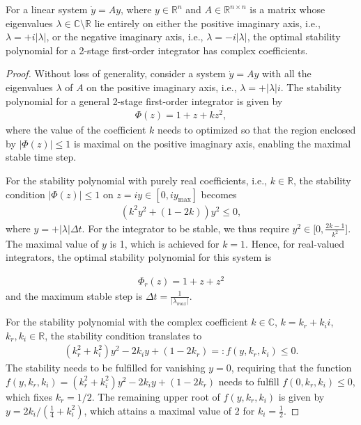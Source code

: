 \documentclass[10pt,a4paper]{amsart}
\begin{document}
\begin{theorem}\label{theorem1}
For a linear system $\dot{y} = A y$, where $y \in \mathbb{R}^n$ and $A \in \mathbb{R}^{n \times n}$ is a matrix whose eigenvalues $\lambda \in \mathbb{C} \setminus \mathbb{R}$ lie entirely on either the positive imaginary axis, i.e., $\lambda = +i|\lambda|$, or the negative imaginary axis, i.e., $\lambda = -i|\lambda|$, the optimal stability polynomial for a 2-stage first-order integrator has complex coefficients. 
\end{theorem}

\begin{proof}
Without loss of generality, consider a system $\dot{y} = A y$ with all the eigenvalues $\lambda$ of $A$ on the positive imaginary axis, i.e., $\lambda = +|\lambda|i$. 
The stability polynomial for a general 2-stage  first-order integrator is given by
\begin{align}
\label{eq:schro_stab}
    \Phi(z) = 1 + z + k z^2,
\end{align}
where the value of the coefficient $k$ needs to optimized so that the region enclosed by $|\Phi(z)| \leq 1$ is maximal on the positive imaginary axis, enabling the maximal stable time step.

For the stability polynomial with purely real coefficients, i.e., $k \in \mathbb{R}$, the stability condition $|\Phi(z)| \leq 1$    on $ z = iy \in [0, iy_{\text{max}}]$ becomes 
\begin{align}
\label{eq:phi2}
    \left(k^2y^2+(1-2k)\right) y^2 \leq 0,
\end{align}
where $y = +|\lambda| \Delta t$. For the integrator to be stable, we thus require $y^2 \in [0, \frac{2k-1}{k^2}$]. The maximal value of $y$ is 1, which is achieved for $k = 1$. Hence, for real-valued integrators, the optimal stability polynomial for this system is 

\begin{align}
    \Phi_r(z) = 1 +z + z^2
    \label{eq:stabschro_real}
\end{align} and the maximum stable step is $\Delta t = \frac{1}{|\lambda_{max}|}$.

For the stability polynomial with the complex coefficient $k \in \mathbb{C}$, $k = k_r + k_i i$, $k_r, k_i \in \mathbb{R}$, the stability condition translates to 
\begin{align}
\label{eq:phi1b}
    (k_r^2+k_i^2)y^2- 2 k_iy+ (1-2k_r) =: f(y,k_r,k_i) \leq 0.
\end{align}
The stability needs to be fulfilled for vanishing $y=0$, requiring that the function $f(y,k_r,k_i)= (k_r^2+k_i^2)y^2- 2 k_iy+ (1-2k_r)$ needs to fulfill $f(0,k_r,k_i) \leq 0$, which fixes $k_r = 1/2$. The remaining upper root of $f(y,k_r,k_i)$ is given by $y = 2 k_i/(\frac{1}{4}+k_i^2)$, which attains a maximal value of $2$ for $k_i = \frac{1}{2}$. 


\end{proof}
\end{document}
